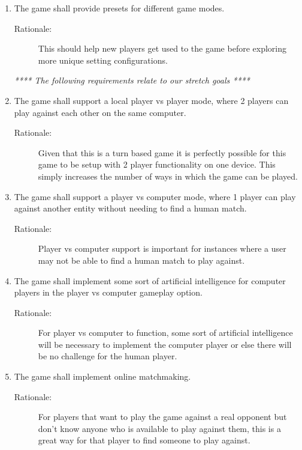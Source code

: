 \begin{enumerate}[label=R\arabic*, start=1, left=0pt]
    \item \label{R10} The game shall provide presets for different game modes.
    \begin{description}
        \item[Rationale:] This should help new players get used to the game before exploring more unique setting configurations.
    \end{description}

    \textit{**** The following requirements relate to our stretch goals ****}
    \item \label{R11} The game shall support a local player vs player mode, where 2 players can play against each other on the same computer.
    \begin{description}
        \item[Rationale:] Given that this is a turn based game it is perfectly possible for this game to be setup with 2 player functionality on one device. This simply increases the number of ways in which the game can be played.
    \end{description}

    \item \label{R12} The game shall support a player vs computer mode, where 1 player can play against another entity without needing to find a human match.
    \begin{description}
        \item[Rationale:] Player vs computer support is important for instances where a user may not be able to find a human match to play against.
    \end{description}

    \item \label{R13} The game shall implement some sort of artificial intelligence for computer players in the player vs computer gameplay option.
    \begin{description}
        \item[Rationale:] For player vs computer to function, some sort of artificial intelligence will be necessary to implement the computer player or else there will be no challenge for the human player.
    \end{description}

    \item \label{R14} The game shall implement online matchmaking.
    \begin{description}
        \item[Rationale:] For players that want to play the game against a real opponent but don't know anyone who is available to play against them, this is a great way for that player to find someone to play against.
    \end{description}


\end{enumerate}

